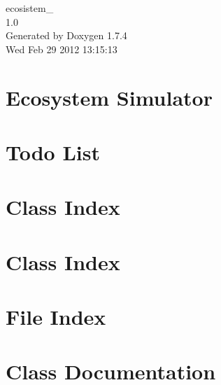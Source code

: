 \documentclass[a4paper]{book}
\begin{document}
\hypersetup{pageanchor=false}
\begin{titlepage}
\vspace*{7cm}
\begin{center}
{\Large ecosistem\_ \\[1ex]\large 1.0 }\\
\vspace*{1cm}
{\large Generated by Doxygen 1.7.4}\\
\vspace*{0.5cm}
{\small Wed Feb 29 2012 13:15:13}\\
\end{center}
\end{titlepage}
\clearemptydoublepage
{}
\tableofcontents
\clearemptydoublepage
{}
\hypersetup{pageanchor=true}
\chapter{Ecosystem Simulator}
\label{index}\hypertarget{index}{}
\chapter{Todo List}
\label{todo}
\hypertarget{todo}{}

\chapter{Class Index}

\chapter{Class Index}

\chapter{File Index}

\chapter{Class Documentation}






























\end{document}
